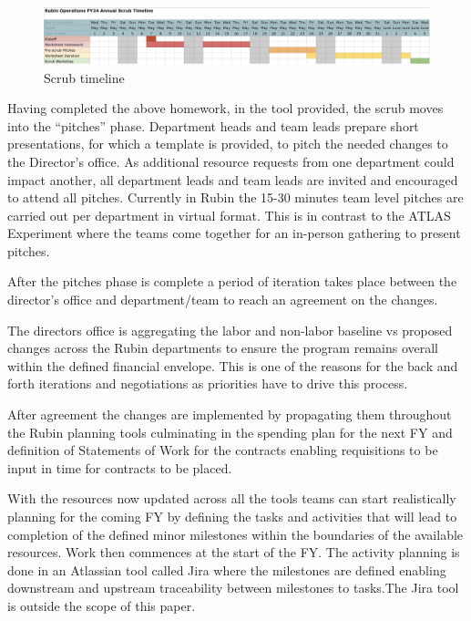 \begin{figure}[hb!]
\begin{centering}
\includegraphics[width=1.0\textwidth]{Figure1Scrubtimeline}
	\caption{Scrub timeline
\label{fig:timeline}}
\end{centering}
\end{figure}
Having completed the above homework, in the tool provided, the scrub moves into the “pitches” phase. Department heads and team leads prepare short presentations, for which a template is provided, to pitch the needed changes to the Director’s office. As additional resource requests from one department could impact another, all department leads and team leads are invited and encouraged to attend all pitches. Currently in Rubin the 15-30 minutes team level pitches are carried out per department in virtual format. This is in contrast to the ATLAS Experiment where the teams come together for an in-person gathering to present pitches.

After the pitches phase is complete a period of iteration takes place between the director’s office and department/team to reach an agreement on the changes.

The directors office is aggregating the labor and non-labor baseline vs proposed changes across the Rubin departments to ensure the program remains overall within the defined financial envelope. This is one of the reasons for the back and forth iterations and negotiations as priorities have to drive this process.

After agreement the changes are implemented by propagating them throughout the Rubin planning tools culminating in the spending plan for the next FY and definition of Statements of Work for the contracts enabling requisitions to be input in time for contracts to be placed.

With the resources now updated across all the tools teams can start realistically planning for the coming FY by defining the tasks and activities that will lead to completion of the defined minor milestones within the boundaries of the available resources. Work then commences at the start of the FY. The activity planning is done in an Atlassian tool called Jira where the milestones are defined enabling downstream and upstream traceability between milestones to tasks.The Jira tool is outside the scope of this paper.

